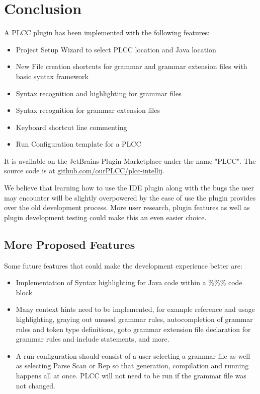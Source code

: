 \documentclass[conference, letterpaper]{IEEEtran}
\begin{document}
\section{Conclusion}\label{sec:conclusion}
A PLCC plugin has been implemented with the following features:
\begin{itemize}
    \item Project Setup Wizard to select PLCC location and Java location
    \item New File creation shortcuts for grammar and grammar extension files with basic syntax framework
    \item Syntax recognition and highlighting for grammar files
    \item Syntax recognition for grammar extension files
    \item Keyboard shortcut line commenting
    \item Run Configuration template for a PLCC
\end{itemize}
It is available on the JetBrains Plugin Marketplace under the name "PLCC".
The source code is at \href{https://github.com/ourPLCC/plcc-intellij}{github.com/ourPLCC/plcc-intellij}.

We believe that learning how to use the IDE plugin along with the bugs the user may encounter will be slightly overpowered by the ease of use the plugin provides over the old development process.
More user research, plugin features as well as plugin development testing could make this an even easier choice.

\subsection{More Proposed Features}\label{subsec:more-proposed-features}

Some future features that could make the development experience better are:
\begin{itemize}
    \item Implementation of Syntax highlighting for Java code within a \%\%\% code block
    \item Many context hints need to be implemented, for example reference and usage highlighting, graying out unused grammar rules, autocompletion of grammar rules and token type definitions, goto grammar extension file declaration for grammar rules and include statements, and more.
    \item A run configuration should consist of a user selecting a grammar file as well as selecting Parse Scan or Rep so that generation, compilation and running happens all at once.
    PLCC will not need to be run if the grammar file was not changed.
\end{itemize}
\end{document}
